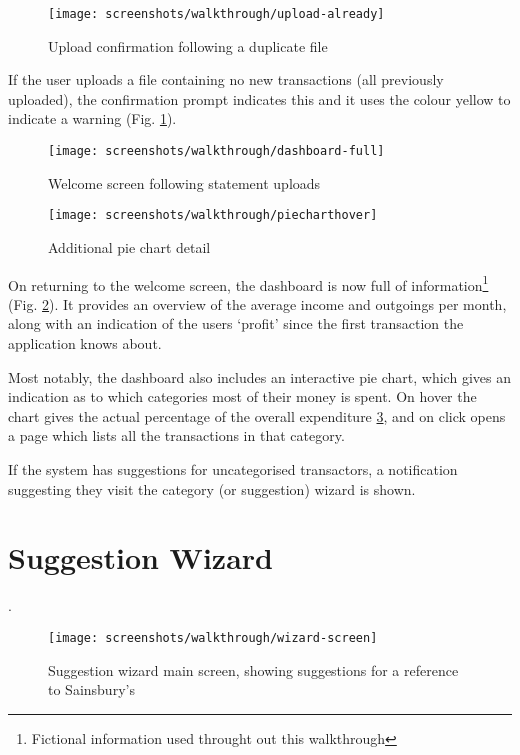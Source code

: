 \begin{figure}
\centering
\texttt{[image: screenshots/walkthrough/upload-already]}
\caption{Upload confirmation following a duplicate file}
\label{fig:upload-duplicate}
\end{figure}

If the user uploads a file containing no new transactions (all previously uploaded), the confirmation prompt indicates this and it uses the colour yellow to indicate a warning (Fig. \ref{fig:upload-duplicate}).

\begin{figure}
\centering
\texttt{[image: screenshots/walkthrough/dashboard-full]}
\caption{Welcome screen following statement uploads}
\label{fig:welcome-full}
\end{figure}

\begin{figure}
\centering
\texttt{[image: screenshots/walkthrough/piecharthover]}
\caption{Additional pie chart detail}
\label{fig:piecharthover}
\end{figure}

On returning to the welcome screen, the dashboard is now full of information\footnote{Fictional information used throught out this walkthrough} (Fig. \ref{fig:welcome-full}). It provides an overview of the average income and outgoings per month, along with an indication of the users `profit' since the first transaction the application knows about. 

Most notably, the dashboard also includes an interactive pie chart, which gives an indication as to which categories most of their money is spent. On hover the chart gives the actual percentage of the overall expenditure \ref{fig:piecharthover}, and on click opens a page which lists all the transactions in that category.

If the system has suggestions for uncategorised transactors, a notification suggesting they visit the category (or suggestion) wizard is shown.

\section{Suggestion Wizard}
\label{subsection:suggestion-wizard-walkthrough}.

\begin{figure}
\centering
\texttt{[image: screenshots/walkthrough/wizard-screen]}
\caption{Suggestion wizard main screen, showing suggestions for a reference to Sainsbury's}
\label{fig:wizard-screen}
\end{figure}

